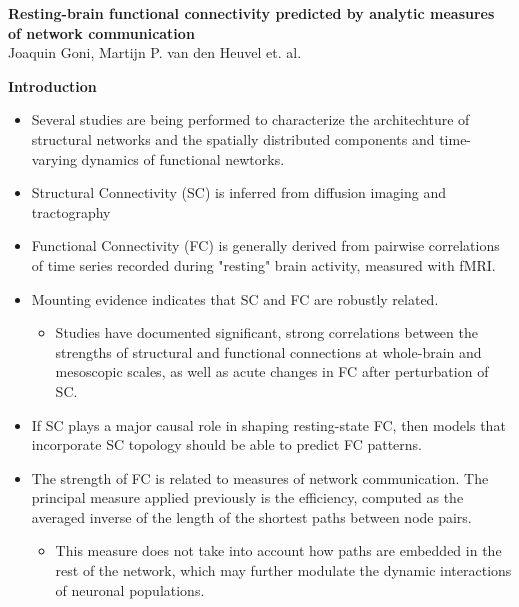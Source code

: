 \documentclass[11pt, letterpaper]{article}
\begin{document}
\begin{center}
    \large\textbf{Resting-brain functional connectivity predicted by analytic measures 
                  of network communication}\\
    \medium Joaquin Goni, Martijn P. van den Heuvel et. al.
\end{center}


\noindent\textbf{Introduction}
\begin{itemize}
    \setlength\itemsep{0.05em}
    
    \item  Several studies are being performed to characterize the architechture of structural networks and the spatially distributed components and time-varying dynamics of functional newtorks.
    \item Structural Connectivity (SC) is inferred from diffusion imaging and tractography
    \item Functional Connectivity (FC) is generally derived from pairwise correlations of time series recorded during "resting" brain activity, measured with fMRI. 
    \item Mounting evidence indicates that SC and FC are robustly related. 
        \begin{itemize}
            \setlength\itemsep{0.05em}
            \item Studies have documented significant, strong correlations between the strengths of structural and functional connections at whole-brain and mesoscopic scales, as well as acute changes in FC after perturbation of SC.
        \end{itemize}
    \item If SC plays a major causal role in shaping resting-state FC, then models that incorporate SC topology should be able to predict FC patterns.
    \item The strength of FC is related to measures of network communication. The principal measure applied previously is the efficiency, computed as the averaged inverse of the length of the shortest paths between node pairs. 
        \begin{itemize}
            \setlength\itemsep{0.05em}
            \item This measure does not take into account how paths are embedded in the rest of the network, which may further modulate the dynamic interactions of neuronal populations. 
        \end{itemize}
\end{itemize}
\end{document}
